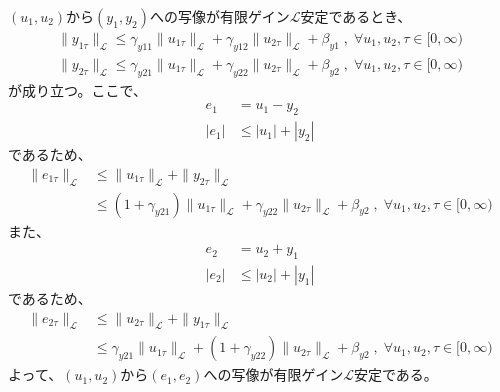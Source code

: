 \documentclass{jsarticle}
\begin{document}
$(u_1,u_2)$から$(y_1,y_2)$への写像が有限ゲイン$\mathcal L$安定であるとき、
\begin{align}
  \|y_{1\tau}\|_\mathcal L \leq \gamma_{y11} \|u_{1\tau}\|_\mathcal L + \gamma_{y12} \|u_{2\tau}\|_\mathcal L + \beta_{y1} \;,\;\forall u_1,u_2 , \tau\in [0,\infty)\\
  \|y_{2\tau}\|_\mathcal L \leq \gamma_{y21} \|u_{1\tau}\|_\mathcal L + \gamma_{y22} \|u_{2\tau}\|_\mathcal L + \beta_{y2} \;,\;\forall u_1,u_2 , \tau\in [0,\infty)
\end{align}
が成り立つ。ここで、
\begin{align*}
  e_1 &= u_1-y_2\\
  |e_1| &\leq |u_1|+|y_2|
\end{align*}
であるため、
\begin{align*}
  \|e_{1\tau}\|_\mathcal L &\leq \|u_{1\tau}\|_\mathcal L + \|y_{2\tau}\|_\mathcal L \\
  & \leq  (1 + \gamma_{y21}) \|u_{1\tau}\|_\mathcal L + \gamma_{y22} \|u_{2\tau}\|_\mathcal L + \beta_{y2} \;,\;\forall u_1,u_2 , \tau\in [0,\infty)
\end{align*}
また、
\begin{align*}
  e_2 &= u_2+y_1\\
  |e_2| &\leq |u_2|+|y_1|
\end{align*}
であるため、
\begin{align*}
  \|e_{2\tau}\|_\mathcal L &\leq \|u_{2\tau}\|_\mathcal L + \|y_{1\tau}\|_\mathcal L \\
  & \leq  \gamma_{y21} \|u_{1\tau}\|_\mathcal L + (1+ \gamma_{y22} )\|u_{2\tau}\|_\mathcal L + \beta_{y2} \;,\;\forall u_1,u_2 , \tau\in [0,\infty)
\end{align*}
よって、$(u_1,u_2)$から$(e_1,e_2)$への写像が有限ゲイン$\mathcal L$安定である。
\end{document}

